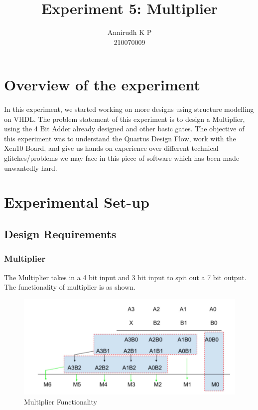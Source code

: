 \documentclass[12pt]{article}
\title{Experiment 5: Multiplier}
\author{Annirudh K P\\%
210070009}
\begin{document}
\maketitle

\section{Overview of the experiment}
\paragraph{}
In this experiment, we started working on more designs using structure modelling on VHDL. The problem statement of this experiment is to design a Multiplier, using the 4 Bit Adder already designed and other basic gates. The objective of this experiment was to understand the Quartus Design Flow, work with the Xen10 Board, and give us hands on experience over different technical glitches/problems we may face in this piece of software which has been made unwantedly hard.

\section{Experimental Set-up}

\subsection{Design Requirements}
\subsubsection{Multiplier}
The Multiplier takes in a 4 bit input and 3 bit input to spit out a 7 bit output. The functionality of multiplier is as shown.

\begin{figure}[H]
\centering
  \includegraphics[scale=0.3]{Images/Multiplier_BlockDiagram.jpg}
  \caption{Multiplier Functionality}
\end{figure}
\end{document}

